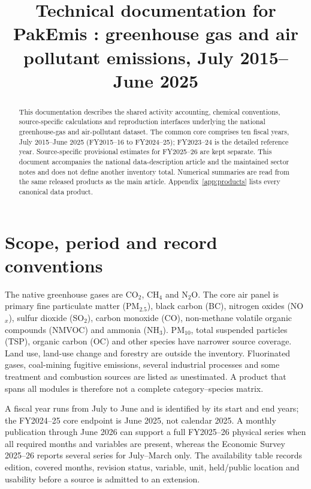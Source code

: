 \documentclass[essd]{copernicus}
\begin{document}
\title{Technical documentation for PakEmis \PakEmisRelease: greenhouse gas and air pollutant emissions, July 2015--June 2025}
\received{}\pubdiscuss{}\revised{}\accepted{}\published{}
\maketitle

\begin{abstract}
This documentation describes the shared activity accounting, chemical conventions, source-specific calculations and reproduction interfaces underlying the national greenhouse-gas and air-pollutant dataset. The common core comprises ten fiscal years, July 2015--June 2025 (FY2015--16 to FY2024--25); FY2023--24 is the detailed reference year. Source-specific provisional estimates for FY2025--26 are kept separate. This document accompanies the national data-description article and the maintained sector notes and does not define another inventory total. Numerical summaries are read from the same released products as the main article. Appendix~\ref{app:products} lists every canonical data product.
\end{abstract}

\section{Scope, period and record conventions}
The native greenhouse gases are CO$_2$, CH$_4$ and N$_2$O. The core air panel is primary fine particulate matter (PM$_{2.5}$), black carbon (BC), nitrogen oxides (NO$_x$), sulfur dioxide (SO$_2$), carbon monoxide (CO), non-methane volatile organic compounds (NMVOC) and ammonia (NH$_3$). PM$_{10}$, total suspended particles (TSP), organic carbon (OC) and other species have narrower source coverage. Land use, land-use change and forestry are outside the inventory. Fluorinated gases, coal-mining fugitive emissions, several industrial processes and some treatment and combustion sources are listed as unestimated. A product that spans all modules is therefore not a complete category--species matrix.

A fiscal year runs from July to June and is identified by its start and end years; the FY2024--25 core endpoint is June 2025, not calendar 2025. A monthly publication through June 2026 can support a full FY2025--26 physical series when all required months and variables are present, whereas the Economic Survey 2025--26 reports several series for July--March only. The availability table records edition, covered months, revision status, variable, unit, held/public location and usability before a source is admitted to an extension.
\end{document}
